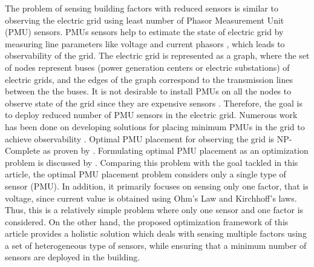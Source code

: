 \documentclass[]{interact}
\theoremstyle{plain}%
\theoremstyle{definition}
\theoremstyle{remark}
\begin{document}
The problem of sensing building factors with reduced sensors is similar to observing the electric grid using least number of Phasor Measurement Unit (PMU) sensors.
PMUs sensors help to estimate the state of electric grid by measuring line parameters like voltage and current phasors \citep{pmu}, which leads to observability of the grid.  
The electric grid is represented as a graph, where the set of nodes represent buses (power generation centers or electric substations) of electric grids,
and the edges of the graph correspond to the transmission lines between the the buses. 
It is not desirable to install PMUs on all the nodes to observe state of the grid since they are expensive sensors \citep{ree_centeno}. 
Therefore, the goal is to deploy reduced number of PMU sensors in the electric grid.
Numerous work has been done on developing solutions for placing minimum PMUs in the grid to achieve observability \citep{pmu_review, taxonomy_pmu}.
Optimal PMU placement for observing the grid is NP-Complete as proven by  \cite{gyllstrom}. 
Formulating optimal PMU placement as an optimization problem is discussed by \cite{soman, abur, xu}. %
Comparing this problem with the goal tackled in this article, the optimal PMU placement problem considers only a single type of sensor (PMU).
In addition, it primarily focuses on sensing only one factor, that is voltage, since current value is obtained using Ohm's Law and Kirchhoff's laws. 
Thus, this is a relatively simple problem where only one sensor and one factor is considered. 
On the other hand, the proposed optimization framework of this article provides a holistic solution which deals with sensing multiple factors using a set of heterogeneous type of sensors, while ensuring that a minimum number of sensors are deployed in the building.
\end{document}
